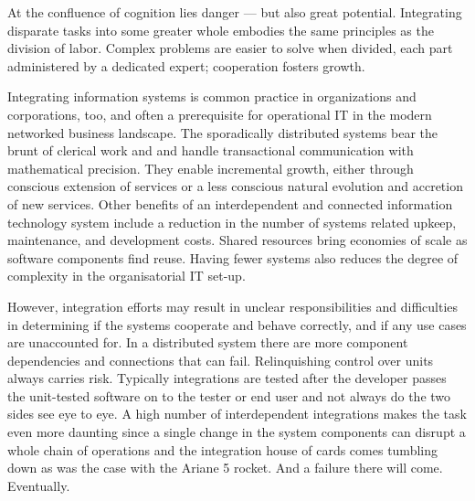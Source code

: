 \documentclass[12pt,a4paper,oneside,pdftex]{report}
\begin{document}
At the confluence of cognition lies danger --- but also great potential. Integrating disparate tasks into some greater whole embodies the same principles as the division of labor. Complex problems are easier to solve when divided, each part administered by a dedicated expert; cooperation fosters growth.

Integrating information systems is common practice in organizations and corporations, too, and often a prerequisite for operational IT in the modern networked business landscape. The sporadically distributed systems bear the brunt of clerical work and and handle transactional communication with mathematical precision. They enable incremental growth, either through conscious extension of services or a less conscious natural evolution and accretion of new services. Other benefits of an interdependent and connected information technology system include a reduction in the number of systems related upkeep, maintenance, and development costs. Shared resources bring economies of scale as software components find reuse. \citep{rehman2007testing} Having fewer systems also reduces the degree of complexity in the organisatorial IT set-up.

\begin{comment}
Automation is one of the great boons brought on by technological development on one hand freeing up resources like labour for more value-adding purposes --- and permitting the execution of uniform, repeatable processes and process control on the other. The pinnacle of advancement and prosperity on which society stands today is based on a continuous flow of various automated tasks and electronic services, many of which are complex and involve a slew of actors or agents. Work is divided and its completion therefore requires cooperation between service systems.
\end{comment}

However, integration efforts may result in unclear responsibilities and difficulties in determining if the systems cooperate and behave correctly, and if any use cases are unaccounted for. In a distributed system there are more component dependencies and connections that can fail. Relinquishing control over units always carries risk. Typically integrations are tested after the developer passes the unit-tested software on to the tester or end user and not always do the two sides see eye to eye. A high number of interdependent integrations makes the task even more daunting since a single change in the system components can disrupt a whole chain of operations and the integration house of cards comes tumbling down as was the case with the Ariane 5 rocket. And a failure there will come. Eventually.
\end{document}
